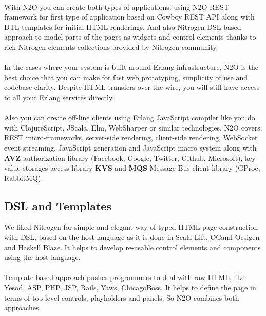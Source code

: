 \paragraph{}
With N2O you can create both types of applications: using N2O REST framework
for first type of application based on Cowboy REST API along with DTL
templates for initial HTML renderings. And also Nitrogen DSL-based approach
to model parts of the pages as widgets and control elements thanks to rich
Nitrogen elements collections provided by Nitrogen community. 

\paragraph{}
In the cases where your system is built around Erlang infrastructure, N2O
is the best choice that you can make for fast web prototyping, simplicity
of use and codebase clarity. Despite HTML transfers over the wire,
you will still have access to all your Erlang services directly.

\paragraph{}
Also you can create off-line clients using Erlang JavaScript compiler
like you do with ClojureScript, JScala, Elm, WebSharper or similar
technologies. N2O covers: REST micro-frameworks, server-side rendering,
client-side rendering, WebSocket event streaming, JavaScript generation
and JavaScript macro system along with {\bf AVZ} authorization
library (Facebook, Google, Twitter, Github, Microsoft), key-value storages
access library {\bf KVS} and {\bf MQS} Message Bus client library (GProc, RabbitMQ).

\subsection*{DSL and Templates}
We liked Nitrogen for simple and elegant way of typed HTML page
construction with DSL, based on the host language as it is done in Scala Lift,
OCaml Ocsigen and Haskell Blaze. It helps to develop re-usable control
elements and components using the host language.

\paragraph{}
Template-based approach pushes programmers to deal with raw HTML,
like Yesod, ASP, PHP, JSP, Rails, Yaws, ChicagoBoss. It helps to
define the page in terms of top-level controls, playholders
and panels. So N2O combines both approaches.

